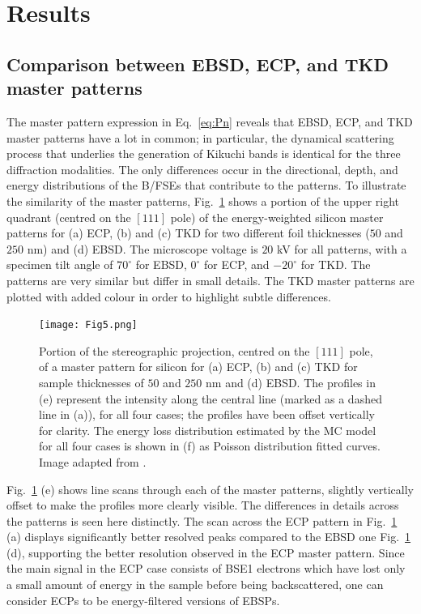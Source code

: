 \section{Results}
\subsection{Comparison between EBSD, ECP, and TKD master patterns}
\label{sec:comparison}
The master pattern expression in Eq.~\ref{eq:Pn} reveals that EBSD, ECP, and TKD master patterns have a lot in common; in particular, the dynamical scattering process that underlies the generation of Kikuchi bands is identical for the three diffraction modalities. The only differences occur in the directional, depth, and energy distributions of the B/FSEs that contribute to the patterns.  To illustrate the similarity of the master patterns, Fig.~\ref{fig:MPs} shows a portion of the upper right quadrant (centred on the $[111]$ pole) of the energy-weighted silicon master patterns for (a) ECP, (b) and (c) TKD for two different foil thicknesses ($50$ and $250$ nm) and (d) EBSD. The  microscope voltage is $20$ kV for all patterns, with a specimen tilt angle of $70^{\circ}$ for EBSD, $0^{\circ}$ for ECP, and $-20^{\circ}$ for TKD.  The patterns are very similar but differ in small details. The TKD master patterns are plotted with added colour in order to highlight  subtle differences.

\begin{figure}[ht]
\centering
\texttt{[image: Fig5.png]}%
\caption[(a) ECP, (b) and  (c) TKD for sample thicknesses of $50$ and $250$ nm and (d) EBSD]{Portion of the stereographic projection, centred on the $[111]$ pole, of a master pattern for silicon for (a) ECP, (b) and  (c) TKD for sample thicknesses of $50$ and $250$ nm and (d) EBSD. The profiles in (e) represent the intensity along the central line (marked as a dashed line in (a)), for all four cases; the profiles have been offset vertically for clarity. The energy loss distribution estimated by the MC model for all four cases is shown in (f) as Poisson distribution fitted curves. Image adapted from \cite{PascalTKD}. }
\label{fig:MPs}
\end{figure}

Fig.~\ref{fig:MPs} (e) shows line scans through each of the master patterns, slightly vertically offset to make the profiles more clearly visible. The differences in details across the patterns is seen here distinctly. The scan across the ECP pattern in Fig.~\ref{fig:MPs} (a) displays significantly better resolved peaks compared to the EBSD one Fig.~\ref{fig:MPs} (d), supporting the better resolution observed in the ECP master pattern. Since the main signal in the ECP case consists of BSE1 electrons which have lost only a small amount of energy in the sample before being backscattered, one can consider ECPs to be energy-filtered versions of EBSPs. 


